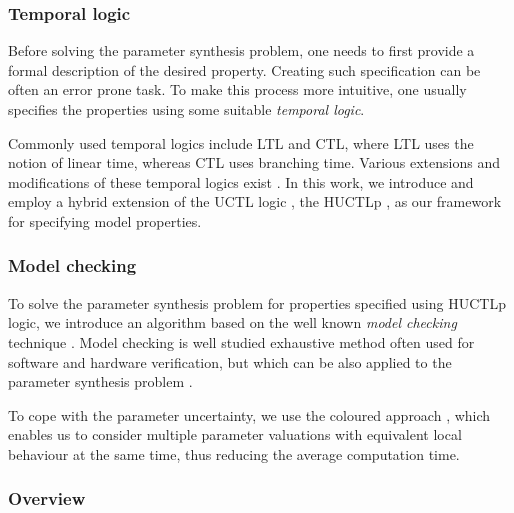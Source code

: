 
\subsubsection{\textbf{Temporal logic}}

Before solving the parameter synthesis problem, one needs to first provide a formal description of the desired property. Creating such specification can be often an error prone task. To make this process more intuitive, one usually specifies the properties using some suitable \emph{temporal logic}. 


Commonly used temporal logics include \acf{LTL} and \acf{CTL}, where \ac{LTL} uses the notion of linear time, whereas \ac{CTL} uses branching time. Various extensions and modifications of these temporal logics exist \cite{ext2, uctl, ext1}. In this work, we introduce and employ a hybrid extension of the UCTL logic \cite{uctl}, the \acf{HUCTLp} \cite{fm2016}, as our framework for specifying model properties.

\subsubsection{\textbf{Model checking}}

To solve the parameter synthesis problem for properties specified using \ac{HUCTLp} logic, we introduce an algorithm based on the well known \emph{model checking} technique \cite{clarke}. Model checking is well studied  exhaustive method often used for software and hardware verification, but which can be also applied to the parameter synthesis problem \cite{batt, gilbert, donze, jha}.

To cope with the parameter uncertainty, we use the coloured approach \cite{ieee, ATVA}, which enables us to consider multiple parameter valuations with equivalent local behaviour at the same time, thus reducing the average computation time.

\subsubsection{\textbf{Overview}}
 
